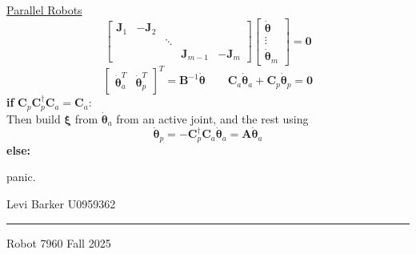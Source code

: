 \documentclass[twocolumn]{article}    %
\begin{document}
\noindent\underline{Parallel Robots}
\begin{equation*}
    \begin{bmatrix}
        \bm{J}_1 & -\bm{J}_2 & & & \\
        & & \ddots & & \\
        & & & \bm{J}_{m-1} & -\bm{J}_m
    \end{bmatrix} \begin{bmatrix}
        \dot{\bm{\theta}} \\ \vdots \\ \dot{\bm{\theta}}_m 
    \end{bmatrix} = \bm{0}  
\end{equation*}
\begin{equation*}
    \begin{bmatrix}
        \dot{\bm{\theta}}_a^T &  \dot{\bm{\theta}}_p^T
    \end{bmatrix}^T = \bm{B}^{-1}\dot{\bm{\theta}} \quad \quad\bm{C}_a\dot{\bm{\theta}}_a + \bm{C}_p\dot{\bm{\theta}}_p = \bm{0}
\end{equation*}
\textbf{if} \(\bm{C}_p\bm{C}_p^\dagger\bm{C}_a = \bm{C}_a\):\\

\hspace{10pt} Then build \(\bm{\xi}\) from \(\dot{\bm{\theta}}_a\) from an active joint, and the rest using 
\begin{equation*}
    \dot{\bm{\theta}}_p  = - \bm{C}_p^\dagger\bm{C}_a \dot{\bm{\theta}}_a = \bm{A} \dot{\bm{\theta}}_a
\end{equation*}
\textbf{else:}
\begin{center}
    \vspace{-5pt}panic.
\end{center}
\vfill
\begin{center}    
    Levi Barker \hspace{82pt} U0959362 \\ \vspace{2pt}
    \hrule
    \vspace{2pt}
    Robot 7960 \hspace{85pt} Fall 2025
\end{center}
\end{document}
